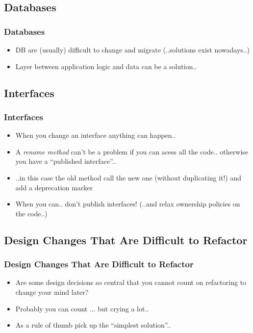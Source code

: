 \documentclass{beamer}
\begin{document}
\subsection{Databases}
\begin{frame}
  \frametitle{Databases} 
  \begin{itemize}
  		\item<+-> DB are (usually) difficult to change and migrate (..solutions exist nowadays..)
  		\item<+-> Layer between application logic and data can be a solution..
  \end{itemize}
\end{frame}

\subsection{Interfaces}
\begin{frame}
  \frametitle{Interfaces} 
  \begin{itemize}
  		\item<+-> When you change an interface anything can happen..
  		\item<+-> A \textit{rename method} can't be a problem if you can acess all the code.. otherwise you have a ``published interface''..
  		\item<+-> ..in this case the old method call the new one (without duplicating it!) and add a deprecation marker
  		\item<+-> When you can.. don't publish interfaces! (..and relax ownership policies on the code..)
  \end{itemize}
\end{frame}

\subsection{Design Changes That Are Difficult to Refactor}
\begin{frame}
  \frametitle{Design Changes That Are Difficult to Refactor} 
  \begin{itemize}
  		\item<+-> Are some design decisions so central that you cannot count on refactoring to change your mind later?
  		\item<+-> Probably you can count ... but crying a lot..
 
  		\item<+-> As a rule of thumb pick up the ``simplest solution''..
  \end{itemize}
\end{frame}
\end{document}
